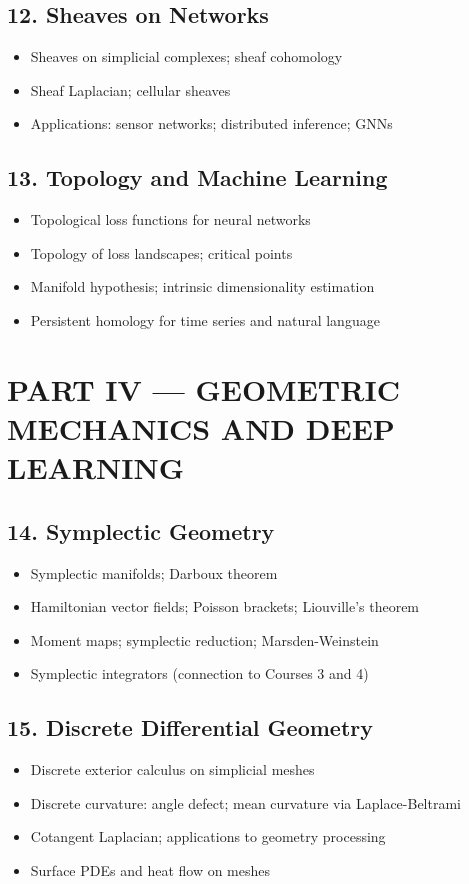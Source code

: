 \subsection{12. Sheaves on Networks}
\begin{itemize}
\item Sheaves on simplicial complexes; sheaf cohomology
\item Sheaf Laplacian; cellular sheaves
\item Applications: sensor networks; distributed inference; GNNs
\end{itemize}

\subsection{13. Topology and Machine Learning}
\begin{itemize}
\item Topological loss functions for neural networks
\item Topology of loss landscapes; critical points
\item Manifold hypothesis; intrinsic dimensionality estimation
\item Persistent homology for time series and natural language
\end{itemize}

\section{PART IV --- GEOMETRIC MECHANICS AND DEEP LEARNING}

\subsection{14. Symplectic Geometry}
\begin{itemize}
\item Symplectic manifolds; Darboux theorem
\item Hamiltonian vector fields; Poisson brackets; Liouville's theorem
\item Moment maps; symplectic reduction; Marsden-Weinstein
\item Symplectic integrators (connection to Courses 3 and 4)
\end{itemize}

\subsection{15. Discrete Differential Geometry}
\begin{itemize}
\item Discrete exterior calculus on simplicial meshes
\item Discrete curvature: angle defect; mean curvature via Laplace-Beltrami
\item Cotangent Laplacian; applications to geometry processing
\item Surface PDEs and heat flow on meshes
\end{itemize}

